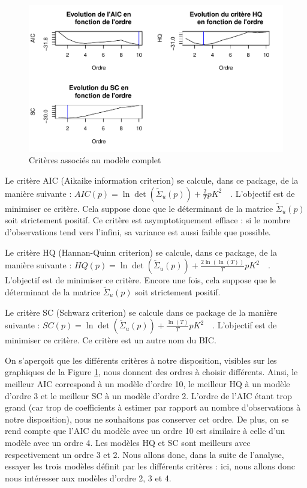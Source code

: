 \documentclass[11pt,]{article}
\begin{document}
\begin{figure}[htbp]
\centering
\includegraphics{doc_files/figure-latex/unnamed-chunk-25-1.pdf}
\caption{\label{fig20} Critères associés au modèle complet}
\end{figure}

Le critère AIC (Aikaike information criterion) se calcule, dans ce
package, de la manière suivante :
\(AIC(p) = \ln \det(\tilde{\Sigma}_u(p)) + \frac{2}{T}p K^2 \quad\).
L'objectif est de minimiser ce critère. Cela suppose donc que le
déterminant de la matrice \(\tilde{\Sigma}_u(p)\) soit strictement
positif. Ce critère est asymptotiquement effiace : si le nombre
d'observations tend vers l'infini, sa variance est aussi faible que
possible.

Le critère HQ (Hannan-Quinn criterion) se calcule, dans ce package, de
la manière suivante :
\(HQ(p) = \ln \det(\tilde{\Sigma}_u(p)) + \frac{2 \ln(\ln(T))}{T}p K^2 \quad\).
L'objectif est de minimiser ce critère. Encore une fois, cela suppose
que le déterminant de la matrice \(\tilde{\Sigma}_u(p)\) soit
strictement positif.

Le critère SC (Schwarz criterion) se calcule dans ce package de la
manière suivante :
\(SC(p) = \ln \det(\tilde{\Sigma}_u(p)) + \frac{\ln(T)}{T}p K^2 \quad\).
L'objectif est de minimiser ce critère. Ce critère est un autre nom du
BIC.

On s'aperçoit que les différents critères à notre disposition, visibles
sur les graphiques de la Figure \ref{fig20}, nous donnent des ordres à
choisir différents. Ainsi, le meilleur AIC correspond à un modèle
d'ordre 10, le meilleur HQ à un modèle d'ordre 3 et le meilleur SC à un
modèle d'ordre 2. L'ordre de l'AIC étant trop grand (car trop de
coefficients à estimer par rapport au nombre d'observations à notre
disposition), nous ne souhaitons pas conserver cet ordre. De plus, on se
rend compte que l'AIC du modèle avec un ordre 10 est similaire à celle
d'un modèle avec un ordre 4. Les modèles HQ et SC sont meilleurs avec
respectivement un ordre 3 et 2. Nous allons donc, dans la suite de
l'analyse, essayer les trois modèles définit par les différents critères
: ici, nous allons donc nous intéresser aux modèles d'ordre 2, 3 et 4.
\end{document}
